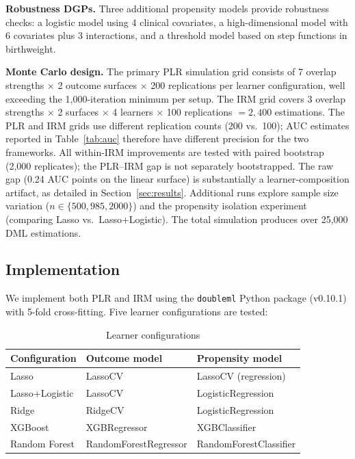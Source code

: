 \documentclass[12pt]{article}
\begin{document}
\noindent\textbf{Robustness DGPs.} Three additional propensity models provide robustness checks: a logistic model using 4 clinical covariates, a high-dimensional model with 6 covariates plus 3 interactions, and a threshold model based on step functions in birthweight.

\medskip
\noindent\textbf{Monte Carlo design.} The primary PLR simulation grid consists of 7 overlap strengths $\times$ 2 outcome surfaces $\times$ 200 replications per learner configuration, well exceeding the 1,000-iteration minimum per setup. The IRM grid covers 3 overlap strengths $\times$ 2 surfaces $\times$ 4 learners $\times$ 100 replications $= 2{,}400$ estimations. The PLR and IRM grids use different replication counts (200 vs.\ 100); AUC estimates reported in Table~\ref{tab:auc} therefore have different precision for the two frameworks. All within-IRM improvements are tested with paired bootstrap (2,000 replicates); the PLR--IRM gap is not separately bootstrapped. The raw gap (0.24 AUC points on the linear surface) is substantially a learner-composition artifact, as detailed in Section~\ref{sec:results}. Additional runs explore sample size variation ($n \in \{500, 985, 2000\}$) and the propensity isolation experiment (comparing Lasso vs.\ Lasso+Logistic). The total simulation produces over 25,000 DML estimations.

\subsection{Implementation}

We implement both PLR and IRM using the \texttt{doubleml} Python package (v0.10.1) with 5-fold cross-fitting. Five learner configurations are tested:

\begin{table}[h!]
\centering
\caption{Learner configurations}
\label{tab:learners}
\begin{tabular}{lll}
\toprule
\textbf{Configuration} & \textbf{Outcome model} & \textbf{Propensity model} \\
\midrule
Lasso            & LassoCV                & LassoCV (regression) \\
Lasso+Logistic   & LassoCV                & LogisticRegression \\
Ridge            & RidgeCV                & LogisticRegression \\
XGBoost          & XGBRegressor           & XGBClassifier \\
Random Forest    & RandomForestRegressor  & RandomForestClassifier \\
\bottomrule
\end{tabular}
\end{table}
\end{document}
